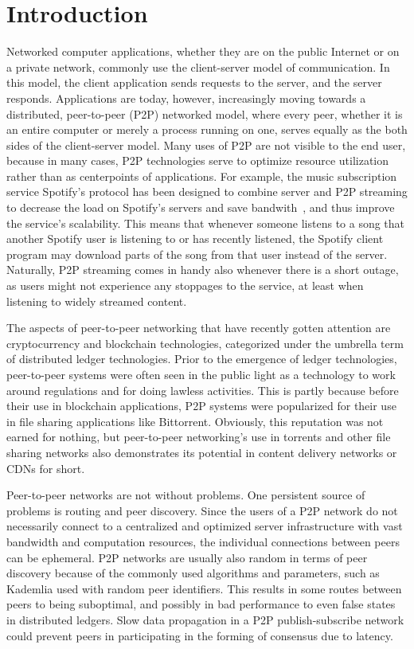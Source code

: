 \chapter{Introduction}
\label{Introduction}

Networked computer applications, whether they are on the public Internet or on a private network, commonly use the client-server model of communication. In this model, the client application sends requests to the server, and the server responds. Applications are today, however, increasingly moving towards a distributed, peer-to-peer (P2P) networked model, where every peer, whether it is an entire computer or merely a process running on one, serves equally as the both sides of the client-server model. Many uses of P2P are not visible to the end user, because in many cases, P2P technologies serve to optimize resource utilization rather than as centerpoints of applications. For example, the music subscription service Spotify's protocol has been designed to combine server and P2P streaming to decrease the load on Spotify's servers and save bandwith~\cite{Kreitz_undated-yp}, and thus improve the service's scalability. This means that whenever someone listens to a song that another Spotify user is listening to or has recently listened, the Spotify client program may download parts of the song from that user instead of the server. Naturally, P2P streaming comes in handy also whenever there is a short outage, as users might not experience any stoppages to the service, at least when listening to widely streamed content.

The aspects of peer-to-peer networking that have recently gotten attention are cryptocurrency and blockchain technologies, categorized under the umbrella term of distributed ledger technologies. Prior to the emergence of ledger technologies, peer-to-peer systems were often seen in the public light as a technology to work around regulations and for doing lawless activities. This is partly because before their use in blockchain applications, P2P systems were popularized for their use in file sharing applications like Bittorrent. Obviously, this reputation was not earned for nothing, but peer-to-peer networking's use in torrents and other file sharing networks also demonstrates its potential in content delivery networks or CDNs for short.

Peer-to-peer networks are not without problems. One persistent source of problems is routing and peer discovery. Since the users of a P2P network do not necessarily connect to a centralized and optimized server infrastructure with vast bandwidth and computation resources, the individual connections between peers can be ephemeral. P2P networks are usually also random in terms of peer discovery because of the commonly used algorithms and parameters, such as Kademlia used with random peer identifiers. This results in some routes between peers to being suboptimal, and possibly in bad performance to even false states in distributed ledgers. Slow data propagation in a P2P publish-subscribe network could prevent peers in participating in the forming of consensus due to latency.

